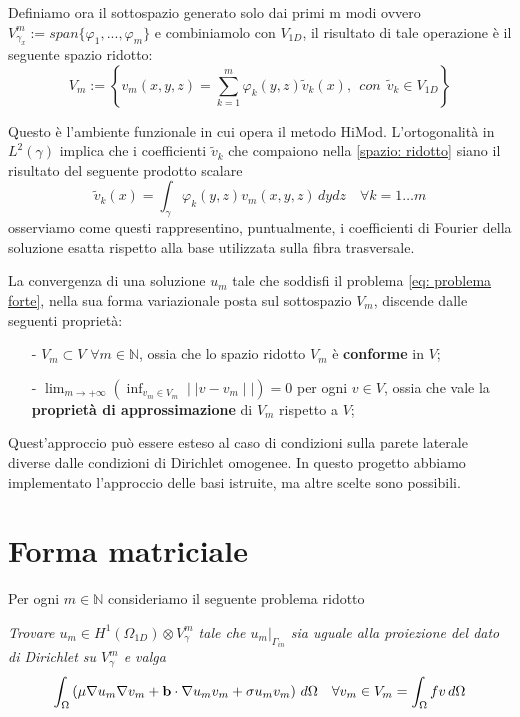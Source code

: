 Definiamo ora il sottospazio generato solo dai primi m modi ovvero  $V^m_{\gamma_x}:=span\{\varphi_1,...,\varphi_m\}$ e combiniamolo con $V_{1D}$, il risultato di tale operazione \`e il seguente spazio ridotto:
\begin{equation}
\label{spazio: ridotto}
V_m:=\left\{v_m(x,y,z)=\sum^m_{k=1}\varphi_k(y,z)\tilde{v}_k(x) ,\:\:con\:\:\tilde{v}_k\in V_{1D}\right\}
\end{equation}

Questo \`e l'ambiente funzionale in cui opera il metodo HiMod.
L'ortogonalit\`a in $L^2(\gamma)$ implica che i coefficienti  $\tilde{v}_k$ che compaiono nella \eqref{spazio: ridotto} 
siano il risultato del seguente prodotto scalare
\begin{displaymath}
\tilde{v}_k(x)=\int_{\gamma}\varphi_k(y,z)v_m(x,y,z)\,dydz\quad\forall k=1\ldots m
\end{displaymath}
osserviamo come questi rappresentino, puntualmente, i coefficienti di Fourier della soluzione esatta rispetto alla base 
utilizzata sulla fibra trasversale.

La convergenza di una soluzione $u_m$ tale che soddisfi il problema \eqref{eq: problema forte}, nella sua forma variazionale
posta sul sottospazio $V_m$, discende dalle seguenti propriet\`a:
\begin{itemize}
\item[-] $V_m \subset V$ $\forall m\in \mathbb{N}$, ossia che lo spazio ridotto $V_m$ \`e \textbf{conforme} in $V$;
\item[-] $\displaystyle \lim_{m\to +\infty} \left(\inf_{v_m\in V_m}\mid\mid v-v_m\mid\mid\right)=0$ 
per ogni $v \in V$, ossia che vale la \textbf{propriet\`a di approssimazione} di $V_m$ rispetto a $V$;
\end{itemize}
Quest'approccio pu\`o essere esteso al caso di condizioni sulla parete laterale diverse dalle condizioni di Dirichlet omogenee.
In questo progetto abbiamo implementato l'approccio delle basi istruite, ma altre scelte sono possibili.

\section{Forma matriciale}
Per ogni $m\in\mathbb{N}$ consideriamo il seguente problema ridotto 

\noindent\emph{Trovare $u_m\in H^1(\Omega_{1D})\otimes V_{\gamma}^m$ tale che $\left.u_m\right|_{\Gamma_{in}}$ sia uguale alla proiezione del dato di Dirichlet 
su $V_\gamma^m$ e valga}
\begin{multline}
\int_\Omega\left(\mu\nabla u_m\nabla v_m + \mathbf{b}\cdot\nabla u_mv_m+\sigma u_mv_m\right)\,d\Omega\quad \forall v_m\in V_m
=\int_\Omega fv \,d\Omega
\end{multline}

